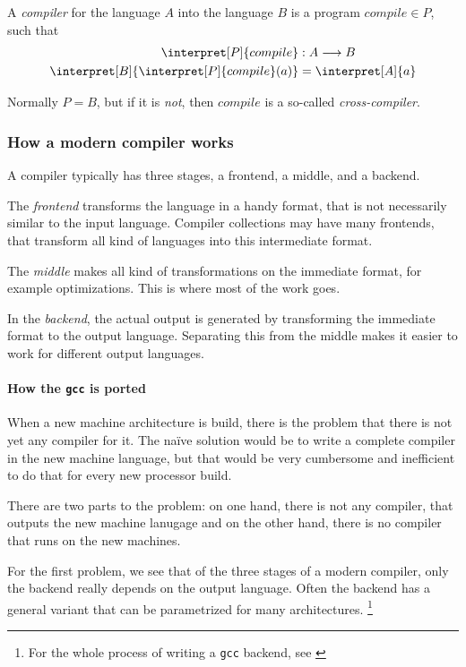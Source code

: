 \begin{defn}
	A {\em compiler} for the language $A$ into the language $B$ is a program
	$compile\in P$, such that
	\begin{align*}
		\interpret[P]{compile} &: A \longrightarrow B\\
		\interpret[B]{\interpret[P]{compile}(a)} &= \interpret[A]{a}
	\end{align*}

	Normally $P=B$, but if it is {\em not}, then $compile$ is a so-called {\em
	cross-compiler}.
\end{defn}

\subsubsection{How a modern compiler works}
A compiler typically has three stages, a frontend, a middle, and a backend.

The {\em frontend} transforms the language in a handy format, that is not 
necessarily similar to the input language. Compiler collections may have many 
frontends, that transform all kind of languages into this intermediate format.

The {\em middle} makes all kind of transformations on the immediate format, 
for example optimizations. This is where most of the work goes\citationneeded.

In the {\em backend}, the actual output is generated by transforming the 
immediate format to the output language. Separating this from the middle 
makes it easier to work for different output languages.

\paragraph{How the {\tt gcc} is ported} %
\label{par:gcc}
When a new machine architecture is build, there is the problem that there is 
not yet any compiler for it. The naïve solution would be to write a complete 
compiler in the new machine language, but that would be very cumbersome and 
inefficient to do that for every new processor build.

There are two parts to the problem: on one hand, there is not any compiler, 
that outputs the new machine lanugage and on the other hand, there is no 
compiler that runs on the new machines.

For the first problem, we see that of the three stages of a modern compiler,
only the backend really depends on the output language. Often the backend has 
a general variant that can be parametrized for many architectures.
\footnote{For the whole process of writing a {\tt gcc} backend, see \cite{nilsson2000porting}}

